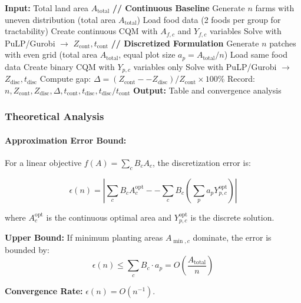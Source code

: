 \documentclass{oqireport}
\begin{document}
\begin{algorithm}[H]
\caption{Grid Refinement Convergence Study}
\begin{algorithmic}[1]
\State \textbf{Input:} Total land area $A_{\text{total}}$
    \State \textbf{// Continuous Baseline}
    \State Generate $n$ farms with uneven distribution (total area $A_{\text{total}}$)
    \State Load food data (2 foods per group for tractability)
    \State Create continuous CQM with $A_{f,c}$ and $Y_{f,c}$ variables
    \State Solve with PuLP/Gurobi $\to$ $Z_{\text{cont}}, t_{\text{cont}}$
    \State
    \State \textbf{// Discretized Formulation}
    \State Generate $n$ patches with even grid (total area $A_{\text{total}}$, equal plot size $a_p = A_{\text{total}}/n$)
    \State Load same food data
    \State Create binary CQM with $Y_{p,c}$ variables only
    \State Solve with PuLP/Gurobi $\to$ $Z_{\text{disc}}, t_{\text{disc}}$
    \State
    \State Compute gap: $\Delta = (Z_{\text{cont}} -- Z_{\text{disc}})/Z_{\text{cont}} \times 100\%$
    \State Record: $n, Z_{\text{cont}}, Z_{\text{disc}}, \Delta, t_{\text{cont}}, t_{\text{disc}}, t_{\text{disc}}/t_{\text{cont}}$
\EndFor
\State \textbf{Output:} Table and convergence analysis
\end{algorithmic}
\end{algorithm}

\subsubsection{Theoretical Analysis}

\paragraph{Approximation Error Bound:}

For a linear objective $f(A) = \sum_c B_c A_c$, the discretization error is:

$$\epsilon(n) = \left| \sum_c B_c A_c^{\text{opt}} -- \sum_c B_c \left(\sum_p a_p Y_{p,c}^{\text{opt}}\right) \right|$$

where $A_c^{\text{opt}}$ is the continuous optimal area and $Y_{p,c}^{\text{opt}}$ is the discrete solution.

\textbf{Upper Bound:} If minimum planting areas $A_{\min,c}$ dominate, the error is bounded by:
$$\epsilon(n) \leq \sum_c B_c \cdot a_p = O\left(\frac{A_{\text{total}}}{n}\right)$$

\textbf{Convergence Rate:} $\epsilon(n) = O(n^{-1})$.
\end{document}
